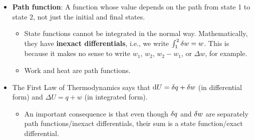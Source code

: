 \documentclass[../notes.tex]{subfiles}
\begin{document}
\begin{itemize}
\begin{itemize}
        \item Reversible compression/expansion (Figure \ref{fig:isothermalManipulationc}).
        \begin{itemize}
            \item In a very slow manner, incrementally increase (resp. decrease) $P_\text{ext}$ so as to allow the gas to reversibly compress (resp. expand).
            \item Compressing a gas reversibly and isothermally does the minimum amount of work on the gas. Expanding a gas reversibly and isothermally requires the gas to do the maximum amount of work.
        \end{itemize}
        \item This work done on the gas raises the internal energy of the system, right? So shouldn't that raise the temperature, making the process not isothermal?
        \item Where does the extra energy above and below the isotherm in the irreversible processes go? Is it converted to heat?
        \item Does this mean that if you used a \SI{1000}{\kilo\gram} weight to compress a gas to half its original volume vs. using a \SI{10}{\kilo\gram} weight to compress a gas to half its original volume, the gas would get 100 times hotter in the former case?
    \end{itemize}
    \item \textbf{Path function}: A function whose value depends on the path from state 1 to state 2, not just the initial and final states.
    \begin{itemize}
        \item State functions cannot be integrated in the normal way. Mathematically, they have \textbf{inexact differentials}, i.e., we write $\int_1^2\var{w}=w$. This is because it makes no sense to write $w_1$, $w_2$, $w_2-w_1$, or $\Delta w$, for example.
        \item Work and heat are path functions.
    \end{itemize}
    \item The First Law of Thermodynamics says that $\dd{U}=\var{q}+\var{w}$ (in differential form) and $\Delta U=q+w$ (in integrated form).
    \begin{itemize}
        \item An important consequence is that even though $\var{q}$ and $\var{w}$ are separately path functions/inexact differentials, their sum is a state function/exact differential.
    \end{itemize}

\end{itemize}
\end{document}
